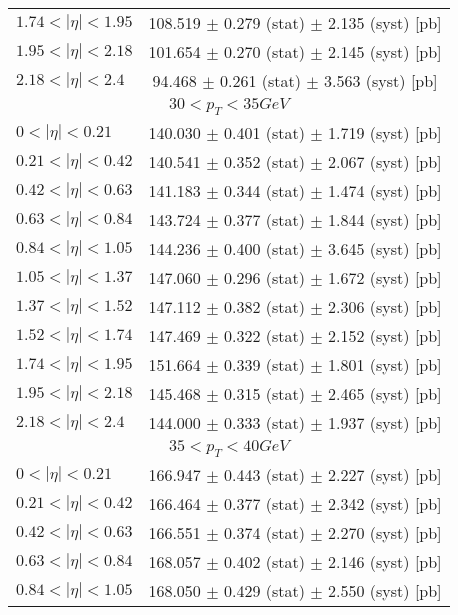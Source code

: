 \begin{tabular}{lc}
$1.74 < |\eta| <1.95$          & 108.519 $\pm$ 0.279 (stat) $\pm$ 2.135 (syst) [pb]  \\
$1.95 < |\eta| <2.18$          & 101.654 $\pm$ 0.270 (stat) $\pm$ 2.145 (syst) [pb]  \\
$2.18 < |\eta| <2.4$           & 94.468 $\pm$ 0.261 (stat) $\pm$ 3.563 (syst) [pb]  \\
\hline
\multicolumn{2}{c}{$30 < p_{T} < 35 GeV$} \\
\hline
$0 < |\eta| <0.21$             & 140.030 $\pm$ 0.401 (stat) $\pm$ 1.719 (syst) [pb]  \\
$0.21 < |\eta| <0.42$          & 140.541 $\pm$ 0.352 (stat) $\pm$ 2.067 (syst) [pb]  \\
$0.42 < |\eta| <0.63$          & 141.183 $\pm$ 0.344 (stat) $\pm$ 1.474 (syst) [pb]  \\
$0.63 < |\eta| <0.84$          & 143.724 $\pm$ 0.377 (stat) $\pm$ 1.844 (syst) [pb]  \\
$0.84 < |\eta| <1.05$          & 144.236 $\pm$ 0.400 (stat) $\pm$ 3.645 (syst) [pb]  \\
$1.05 < |\eta| <1.37$          & 147.060 $\pm$ 0.296 (stat) $\pm$ 1.672 (syst) [pb]  \\
$1.37 < |\eta| <1.52$          & 147.112 $\pm$ 0.382 (stat) $\pm$ 2.306 (syst) [pb]  \\
$1.52 < |\eta| <1.74$          & 147.469 $\pm$ 0.322 (stat) $\pm$ 2.152 (syst) [pb]  \\
$1.74 < |\eta| <1.95$          & 151.664 $\pm$ 0.339 (stat) $\pm$ 1.801 (syst) [pb]  \\
$1.95 < |\eta| <2.18$          & 145.468 $\pm$ 0.315 (stat) $\pm$ 2.465 (syst) [pb]  \\
$2.18 < |\eta| <2.4$           & 144.000 $\pm$ 0.333 (stat) $\pm$ 1.937 (syst) [pb]  \\
\hline
\multicolumn{2}{c}{$35 < p_{T} < 40 GeV$} \\
\hline
$0 < |\eta| <0.21$             & 166.947 $\pm$ 0.443 (stat) $\pm$ 2.227 (syst) [pb]  \\
$0.21 < |\eta| <0.42$          & 166.464 $\pm$ 0.377 (stat) $\pm$ 2.342 (syst) [pb]  \\
$0.42 < |\eta| <0.63$          & 166.551 $\pm$ 0.374 (stat) $\pm$ 2.270 (syst) [pb]  \\
$0.63 < |\eta| <0.84$          & 168.057 $\pm$ 0.402 (stat) $\pm$ 2.146 (syst) [pb]  \\
$0.84 < |\eta| <1.05$          & 168.050 $\pm$ 0.429 (stat) $\pm$ 2.550 (syst) [pb]  \\

\end{tabular}
